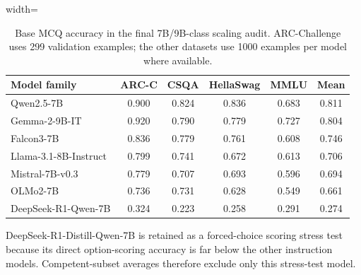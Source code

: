 \begin{table}[t]
\centering
\small
\caption{Base MCQ accuracy in the final 7B/9B-class scaling audit. ARC-Challenge uses 299 validation examples; the other datasets use 1000 examples per model where available.}
\label{tab:base-accuracy}
\begin{threeparttable}
\begin{adjustbox}{width=\textwidth}
\begin{tabular}{lccccc}
\toprule
Model family & ARC-C & CSQA & HellaSwag & MMLU & Mean \\
\midrule
Qwen2.5-7B & 0.900 & 0.824 & 0.836 & 0.683 & 0.811 \\
Gemma-2-9B-IT & 0.920 & 0.790 & 0.779 & 0.727 & 0.804 \\
Falcon3-7B & 0.836 & 0.779 & 0.761 & 0.608 & 0.746 \\
Llama-3.1-8B-Instruct & 0.799 & 0.741 & 0.672 & 0.613 & 0.706 \\
Mistral-7B-v0.3 & 0.779 & 0.707 & 0.693 & 0.596 & 0.694 \\
OLMo2-7B & 0.736 & 0.731 & 0.628 & 0.549 & 0.661 \\
DeepSeek-R1-Qwen-7B & 0.324 & 0.223 & 0.258 & 0.291 & 0.274 \\
\bottomrule
\end{tabular}
\end{adjustbox}

\begin{tablenotes}[flushleft]\footnotesize\item \parbox{0.95\textwidth}{DeepSeek-R1-Distill-Qwen-7B is retained as a forced-choice scoring stress test because its direct option-scoring accuracy is far below the other instruction models. Competent-subset averages therefore exclude only this stress-test model.}\end{tablenotes}
\end{threeparttable}
\end{table}
